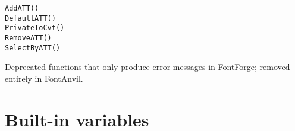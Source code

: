 \noindent
\texttt{AddATT()}\FFdiff\\
\texttt{DefaultATT()}\\
\texttt{PrivateToCvt()}\\
\texttt{RemoveATT()}\\
\texttt{SelectByATT()}

Deprecated functions that only produce error messages in FontForge; removed
entirely in FontAnvil.


\section{Built-in variables}

